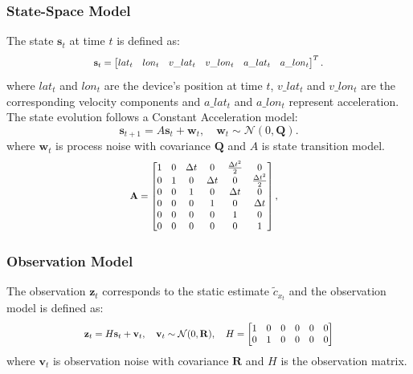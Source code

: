 \documentclass[journal,twoside,web]{ieeecolor}
\begin{document}
\subsubsection{State-Space Model} 
The state \( \mathbf{s}_t \) at time \( t \) is defined as:
\begin{equation}
\scalebox{0.85}{$
 \mathbf{s}_t = \begin{bmatrix} lat_t & lon_t & v\_lat_t & v\_lon_t & a\_lat_t & a\_lon_t \end{bmatrix}^T . $}
\end{equation}
where \(lat_t\) and  \(lon_t\) are the device’s position at time \(t\), \(v\_lat_t\) and  \(v\_lon_t\) are the corresponding velocity components and \(a\_lat_t\) and \(a\_lon_t\) represent acceleration. 
The state evolution follows a Constant Acceleration model:
\begin{equation}
\mathbf{s}_{t+1} = A\mathbf{s}_t + \mathbf{w}_t, \quad \mathbf{w}_t \sim \mathcal{N}(0, \mathbf{Q}).
\end{equation}
where \( \mathbf{w}_t \) is process noise with covariance \( \mathbf{Q} \) and \(A\) is state transition model.
\begin{equation}
\scalebox{0.85}{$
    \mathbf{A} = \begin{bmatrix}  
        1 & 0 & \Delta t & 0 & \frac{\Delta t^2}{2}  & 0\\
        0 & 1 & 0 & \Delta t & 0 & \frac{\Delta t^2}{2}\\
        0 & 0 & 1 & 0 & \Delta t & 0\\
        0 & 0 & 0 & 1 & 0 &  \Delta t \\
        0 & 0 & 0 & 0 & 1 & 0 \\
        0 & 0 & 0 & 0 & 0 & 1 \\
    \end{bmatrix}, \quad $}   
\end{equation} 
\subsubsection{Observation Model}
The observation \( \mathbf{z}_t \) corresponds to the static estimate \( \tilde c_{x_t} \) and the observation model is defined as:
\begin{equation}
\scalebox{0.85}{$
\mathbf{z}_t = H\mathbf{s}_t + \mathbf{v}_t, \quad \mathbf{v}_t \sim \mathcal{N}(0, \mathbf{R}), \quad 
 H = \begin{bmatrix}
    1 & 0 & 0 & 0 & 0 & 0\\
    0 & 1 & 0 & 0 & 0 & 0\\
\end{bmatrix} $}
\end{equation}
where \( \mathbf{v}_t \) is observation noise with covariance \( \mathbf{R} \) and \(H\) is the observation matrix.
\end{document}
